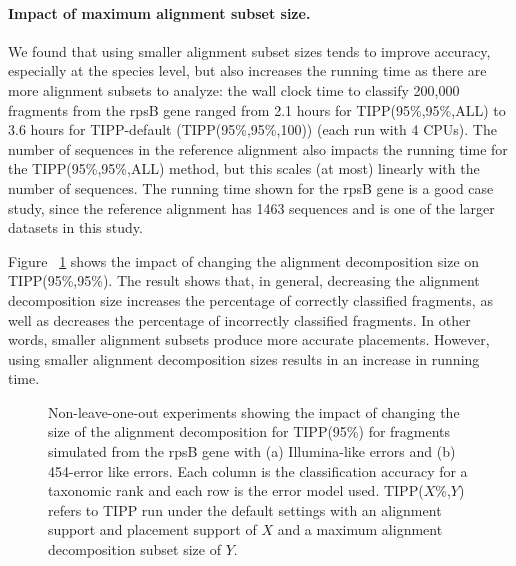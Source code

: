 \paragraph{Impact of maximum alignment subset size. }
We found that using smaller alignment subset sizes tends to improve accuracy, 
especially at the species level,
but also increases the running time as there are more alignment subsets to analyze:
the wall clock time to classify 200,000 fragments from the rpsB gene ranged from 2.1 hours  for TIPP(95\%,95\%,ALL) to 3.6 hours for TIPP-default (TIPP(95\%,95\%,100)) (each run with 4 CPUs).  The number of sequences in the reference alignment also impacts the running time for the TIPP(95\%,95\%,ALL) method, but this scales (at most) linearly with the number of sequences. The running time shown for the rpsB gene is a good case study, since the reference alignment has 1463 sequences and is one of the larger datasets  in this study.

Figure ~\ref{tipp:alignment_size_95} shows the impact of changing the alignment decomposition size on TIPP(95\%,95\%).  The result shows that, in general, decreasing the alignment decomposition size increases the percentage of correctly classified fragments, as well as decreases the percentage of incorrectly classified fragments.  
In other words, smaller alignment subsets produce more accurate placements.
However, using smaller alignment decomposition sizes results in an increase in running time.

\begin{figure}[htpb]
\begin{center}
\end{center}
\begin{center}
\end{center}
\caption[Varying decomposition size for TIPP(95\%).]{\label{tipp:alignment_size_95}Non-leave-one-out experiments showing the impact of changing the size of the alignment decomposition for TIPP(95\%) for fragments simulated from the rpsB gene with (a) Illumina-like errors and (b) 454-error like errors.  Each column is the classification accuracy for a taxonomic rank and each row is the error model used. TIPP($X$\%,$Y$) refers to TIPP run under the default settings with an alignment support and placement support of $X$ and a maximum alignment decomposition subset size of $Y$.
}
\end{figure}


